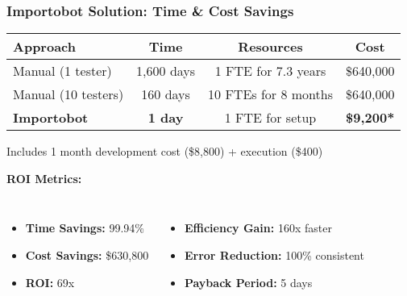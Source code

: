 \begin{frame}
\frametitle{Importobot Solution: Time \& Cost Savings}
\begin{center}
\begin{tabular}{|l|c|c|c|}
\hline
\textbf{Approach} & \textbf{Time} & \textbf{Resources} & \textbf{Cost} \\
\hline
Manual (1 tester) & 1,600 days & 1 FTE for 7.3 years & \$640,000 \\
\hline
Manual (10 testers) & 160 days & 10 FTEs for 8 months & \$640,000 \\
\hline
\textbf{Importobot} & \textbf{1 day} & 1 FTE for setup & \textbf{\$9,200*} \\
\hline
\end{tabular}
\end{center}

{\footnotesize *Includes 1 month development cost (\$8,800) + execution (\$400)}

\textbf{ROI Metrics:}
\begin{columns}
\begin{itemize}
    \item \textbf{Time Savings:} 99.94\%
    \item \textbf{Cost Savings:} \$630,800
    \item \textbf{ROI:} 69x
\end{itemize}

\begin{itemize}
    \item \textbf{Efficiency Gain:} 160x faster
    \item \textbf{Error Reduction:} 100\% consistent
    \item \textbf{Payback Period:} 5 days
\end{itemize}
\end{columns}
\end{frame}

